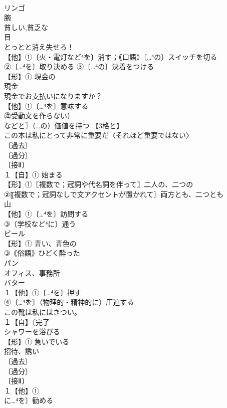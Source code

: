 \documentclass[8pt]{extreport}
\begin{document}
\begin{CJK}{UTF8}{min}
\\	リンゴ 
\\	腕 
\\	貧しい,貧乏な
\\	目 
\\	とっとと消え失せろ！
\\	【他】①〔火・電灯など⁴を〕消す；｟口語｠〔…⁴の〕スイッチを切る 
\\	②〔…⁴を〕取り決める ③〔…⁴の〕決着をつける
\\	【形】① 現金の 
\\	現金 
\\	現金でお支払いになりますか？
\\	【他】①〔…⁴を〕意味する 
\\	㊟受動文を作らない） 
\\	などと〗（…の）価値を持つ 【3格と】
\\	この本は私にとって非常に重要だ〈それほど重要ではない〉
\\	〔過去〕
\\	〔過分〕
\\	〔接Ⅱ〕
\\	１【自】① 始まる 
\\	【形】①〖複数で；冠詞や代名詞を伴って〗二人の、二つの 
\\	②〖複数で；冠詞なしで文アクセントが置かれて〗両方とも、二つとも 
\\	山 
\\	【他】①〔…⁴を〕訪問する
\\	③〔学校など⁴に〕通う 
\\	ビール 
\\	【形】① 青い、青色の 
\\	③｟俗語｠ひどく酔った
\\	パン 
\\	オフィス、事務所 
\\	バター 
\\	１【他】①〔…⁴を〕押す
\\	④〔…⁴を〕（物理的・精神的に）圧迫する 
\\	この靴は私にはきつい。
\\	１【自】〔完了
\\	シャワーを浴びる
\\	【形】① 急いでいる 
\\	招待、誘い 
\\	〔過去〕
\\	〔過分〕
\\	〔接Ⅱ〕
\\	１【他】①
\\	に…⁴を〕勧める

\end{CJK}
\end{document}
